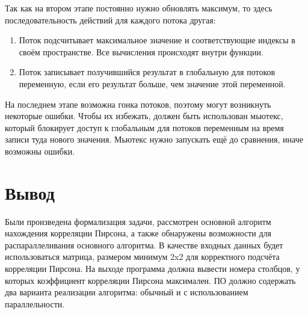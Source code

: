 Так как на втором этапе постоянно нужно обновлять максимум, то здесь последовательность действий для каждого потока другая:
\begin{enumerate}
	\item Поток подсчитывает максимальное значение и соответствующие индексы в своём пространстве. Все вычисления происходят внутри функции.
	\item Поток записывает получившийся результат в глобальную для потоков переменную, если его результат больше, чем значение этой переменной.
\end{enumerate}

На последнем этапе возможна гонка потоков, поэтому могут возникнуть некоторые ошибки. Чтобы их избежать, должен быть использован мьютекс,
который блокирует доступ к глобальным для потоков переменным на время записи туда нового значения. Мьютекс нужно запускать ещё до сравнения,
иначе возможны ошибки. 

\section{Вывод}
Были произведена формализация задачи, рассмотрен основной алгоритм нахождения корреляции Пирсона, а также обнаружены возможности
для распараллеливания основного алгоритма.
В качестве входных данных будет использоваться матрица, размером минимум 2x2 для корректного подсчёта корреляции Пирсона. 
На выходе программа должна вывести номера столбцов, у которых коэффициент корреляции Пирсона максимален. 
ПО должно содержать два варианта реализации алгоритма: обычный и с использованием параллельности. 